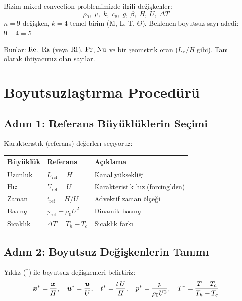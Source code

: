 \begin{example}
Bizim mixed convection problemimizde ilgili değişkenler:
\[
\rho_0, \; \mu, \; k, \; c_p, \; g, \; \beta, \; H, \; U, \; \Delta T
\]
$n = 9$ değişken, $k = 4$ temel birim (M, L, T, $\Theta$). Beklenen boyutsuz sayı adedi: $9 - 4 = 5$.

Bunlar: $\mathrm{Re}$, $\mathrm{Ra}$ (veya $\mathrm{Ri}$), $\mathrm{Pr}$, $\mathrm{Nu}$ ve bir geometrik oran ($L_x/H$ gibi). Tam olarak ihtiyacımız olan sayılar.
\end{example}


\section{Boyutsuzlaştırma Procedürü}
\label{sec:boyutsuzlastirma}

\subsection{Adım 1: Referans Büyüklüklerin Seçimi}

Karakteristik (referans) değerleri seçiyoruz:
\begin{center}
\begin{tabular}{lll}
\toprule
\textbf{Büyüklük} & \textbf{Referans} & \textbf{Açıklama} \\
\midrule
Uzunluk & $L_{\text{ref}} = H$ & Kanal yüksekliği \\
Hız & $U_{\text{ref}} = U$ & Karakteristik hız (forcing'den) \\
Zaman & $t_{\text{ref}} = H/U$ & Advektif zaman ölçeği \\
Basınç & $p_{\text{ref}} = \rho_0 U^2$ & Dinamik basınç \\
Sıcaklık & $\Delta T = T_h - T_c$ & Sıcaklık farkı \\
\bottomrule
\end{tabular}
\end{center}

\subsection{Adım 2: Boyutsuz Değişkenlerin Tanımı}

Yıldız ($^*$) ile boyutsuz değişkenleri belirtiriz:
\begin{equation}
    \bm{x}^* = \frac{\bm{x}}{H}, \quad
    \bm{u}^* = \frac{\bm{u}}{U}, \quad
    t^* = \frac{t\,U}{H}, \quad
    p^* = \frac{p}{\rho_0 U^2}, \quad
    T^* = \frac{T - T_c}{T_h - T_c}
    \label{eq:nondim_vars}
\end{equation}

